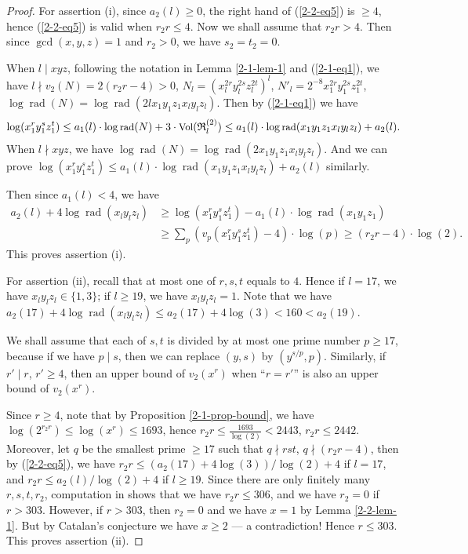 \documentclass[a4paper, 12pt]{article}
\DeclareMathOperator{\rad}{\text{rad}}
\DeclareMathOperator{\Vol}{\text{Vol}}
\numberwithin{equation}{section}
\theoremstyle{definition}
\begin{document}
\begin{proof}
For assertion (i), since $a_2(l) \ge 0$, the right hand of (\ref{2-2-eq5}) is $\ge 4$, hence (\ref{2-2-eq5}) is valid when $r_2r \le 4$.
Now we shall assume that $r_2r > 4$.
Then since $\gcd(x,y,z) = 1$ and $r_2>0$, we have $s_2 = t_2 = 0$.

When $l\mid xyz$, following the notation in Lemma \ref{2-1-lem-1} and (\ref{2-1-eq1}),
we have $l \nmid v_2(N) = 2(r_2r-4) > 0$, $N_l = (x_l^{2r} y_l^{2s} z_l^{2t})^l$, $N'_l = 2^{-8}x_1^{2r} y_1^{2s} z_1^{2t}$, $\log\rad(N) = \log\rad(2l x_1y_1z_1 x_l y_lz_l)$.
Then by (\ref{2-1-eq1}) we have
\begin{equation*} \small 
    \log(x_1^{r} y_1^{s} z_1^{t}) \le  a_1(l) \cdot \log\rad(N)  + 3\cdot \Vol(\mathfrak R_l^{(2)}) \le a_1(l) \cdot \log\rad(x_1y_1z_1 x_ly_lz_l) + a_2(l) .
\end{equation*}
When $l\nmid xyz$, we have $\log\rad(N) = \log\rad(2 x_1y_1z_1 x_l y_lz_l)$. And we can prove $ \log(x_1^{r} y_1^{s} z_1^{t}) \le a_1(l) \cdot \log\rad(x_1y_1z_1 x_ly_lz_l) + a_2(l)$ similarly.

Then since $a_1(l) < 4$, we have
\small\begin{align*} 
    a_2(l) + 4\log\rad(x_l y_l z_l)  
    &\ge \log(x_1^{r} y_1^{s} z_1^{t}) - a_1(l) \cdot \log\rad(x_1 y_1 z_1) \\
    &\ge \sum_{p} (v_p(x_1^{r} y_1^{s} z_1^{t})-4)\cdot\log(p)
    \ge (r_2r-4) \cdot \log(2) .
\end{align*}\normalsize
This proves assertion (i).

For assertion (ii), recall that at most one of $r,s,t$ equals to $4$. Hence if $l=17$, we have $x_ly_lz_l \in \{1,3\}$; if $l\ge 19$, we have $x_ly_lz_l = 1$.
Note that we have $a_2(17) + 4\log\rad(x_l y_l z_l)  \le a_2(17) + 4\log(3) < 160 < a_2(19)$. 

We shall assume that each of $s,t$ is divided by at most one prime number $p \ge 17$, because if we have $p \mid s$, then we can replace $(y,s)$ by $(y^{s/p},p)$.
Similarly, if $r' \mid r$, $r' \ge 4$, then an upper bound of $v_2(x^r)$ when ``$r=r'$'' is also an upper bound of $v_2(x^r)$.

Since $r\ge 4$, note that by Proposition \ref{2-1-prop-bound}, we have $\log(2^{r_2 r}) \le \log(x^r) \le 1693$, hence $r_2r \le \frac{1693}{\log(2)} <2443$, $r_2r \le 2442$. Moreover, let $q$ be the smallest prime $\ge 17$ such that $q\nmid rst$, $q\nmid (r_2r-4)$, then by (\ref{2-2-eq5}), we have $r_2 r \le (a_2(17)+4\log(3)) / \log(2) + 4$ if $l=17$, and $r_2 r \le a_2(l) / \log(2) + 4$ if $l \ge 19$.
Since there are only finitely many $r,s,t,r_2$, computation in \cite{code_of_zpzhou} shows that we have $r_2 r \le 306$, and we have $r_2 = 0$ if $r > 303$. However, if $r > 303$, then $r_2 = 0$ and we have $x = 1$ by Lemma \ref{2-2-lem-1}. But by Catalan's conjecture we have $x\ge 2$ --- a contradiction!
Hence $r \le 303$. This proves assertion (ii).
\end{proof}
\end{document}
